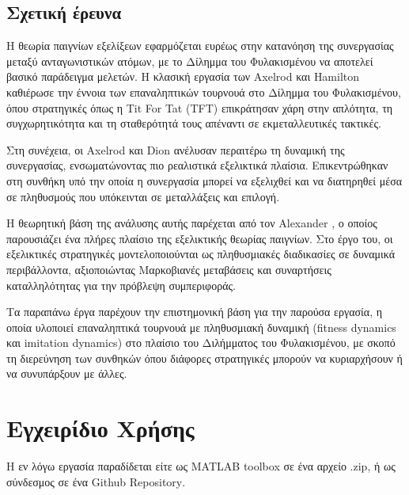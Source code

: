 \documentclass[12pt]{report}
\begin{document}
\subsection{Σχετική έρευνα}
Η θεωρία παιγνίων εξελίξεων εφαρμόζεται ευρέως στην κατανόηση της συνεργασίας μεταξύ ανταγωνιστικών ατόμων, με το Δίλημμα του Φυλακισμένου να αποτελεί βασικό παράδειγμα μελετών. Η κλασική εργασία των \foreignlanguage{english}{Axelrod} και \foreignlanguage{english}{Hamilton} \cite{axelrod1981} καθιέρωσε την έννοια των επαναληπτικών τουρνουά στο Δίλημμα του Φυλακισμένου, όπου στρατηγικές όπως η \textlatin{Tit For Tat (TFT)} επικράτησαν χάρη στην απλότητα, τη συγχωρητικότητα και τη σταθερότητά τους απέναντι σε εκμεταλλευτικές τακτικές.

Στη συνέχεια, οι \foreignlanguage{english}{Axelrod} και \foreignlanguage{english}{Dion} \cite{axelrod1988} ανέλυσαν περαιτέρω τη δυναμική της συνεργασίας, ενσωματώνοντας πιο ρεαλιστικά εξελικτικά πλαίσια. Επικεντρώθηκαν στη συνθήκη υπό την οποία η συνεργασία μπορεί να εξελιχθεί και να διατηρηθεί μέσα σε πληθυσμούς που υπόκεινται σε μεταλλάξεις και επιλογή.

Η θεωρητική βάση της ανάλυσης αυτής παρέχεται από τον \foreignlanguage{english}{Alexander} \cite{alexander2023}, ο οποίος παρουσιάζει ένα πλήρες πλαίσιο της εξελικτικής θεωρίας παιγνίων. Στο έργο του, οι εξελικτικές στρατηγικές μοντελοποιούνται ως πληθυσμιακές διαδικασίες σε δυναμικά περιβάλλοντα, αξιοποιώντας Μαρκοβιανές μεταβάσεις και συναρτήσεις καταλληλότητας για την πρόβλεψη συμπεριφοράς.

Τα παραπάνω έργα παρέχουν την επιστημονική βάση για την παρούσα εργασία, η οποία υλοποιεί επαναληπτικά τουρνουά με πληθυσμιακή δυναμική (\foreignlanguage{english}{fitness dynamics} και \foreignlanguage{english}{imitation dynamics}) στο πλαίσιο του Διλήμματος του Φυλακισμένου, με σκοπό τη διερεύνηση των συνθηκών όπου διάφορες στρατηγικές μπορούν να κυριαρχήσουν ή να συνυπάρξουν με άλλες.

\section{Εγχειρίδιο Χρήσης}
Η εν λόγω εργασία παραδίδεται είτε ως \foreignlanguage{english}{MATLAB toolbox} σε ένα αρχείο \foreignlanguage{english}{.zip}, ή ως σύνδεσμος σε ένα \foreignlanguage{english}{Github Repository}.
\end{document}
